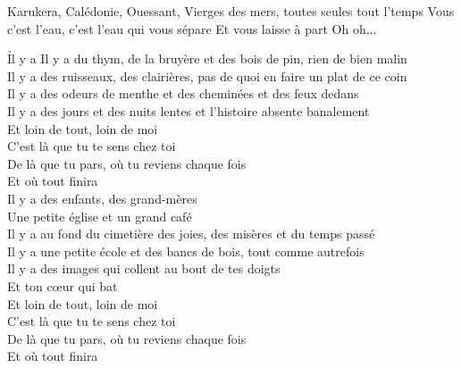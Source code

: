 \documentclass{novel}
\begin{document}
{\begin{minipage}[t][0.4\textheight][t]{\textwidth}
\begin{multicols}{2}
Karukera, Calédonie, Ouessant,
Vierges des mers, toutes seules tout l'temps
Vous c'est l'eau, c'est l'eau qui vous sépare
Et vous laisse à part
Oh oh... \\

\end{multicols}
\end{minipage}
\vspace{0.09\textheight}

\begin{minipage}[b][0.55\textheight][t]{\textwidth}
\h*{Il y a}
\small
Il y a du thym, de la bruyère et des bois de pin, rien de bien malin \\
Il y a des ruisseaux, des clairières, pas de quoi en faire un plat de ce coin \\
Il y a des odeurs de menthe et des cheminées et des feux dedans \\
Il y a des jours et des nuits lentes et l'histoire absente banalement \\

Et loin de tout, loin de moi \\
C'est là que tu te sens chez toi \\
De là que tu pars, où tu reviens chaque fois \\
Et où tout finira \\

Il y a des enfants, des grand-mères \\
Une petite église et un grand café \\
Il y a au fond du cimetière des joies, des misères et du temps passé \\
Il y a une petite école et des bancs de bois, tout comme autrefois \\
Il y a des images qui collent au bout de tes doigts \\
Et ton cœur qui bat \\

Et loin de tout, loin de moi \\
C'est là que tu te sens chez toi \\
De là que tu pars, où tu reviens chaque fois \\
Et où tout finira \\
\end{minipage}
}

\newpage
\normalsize
\end{document}
